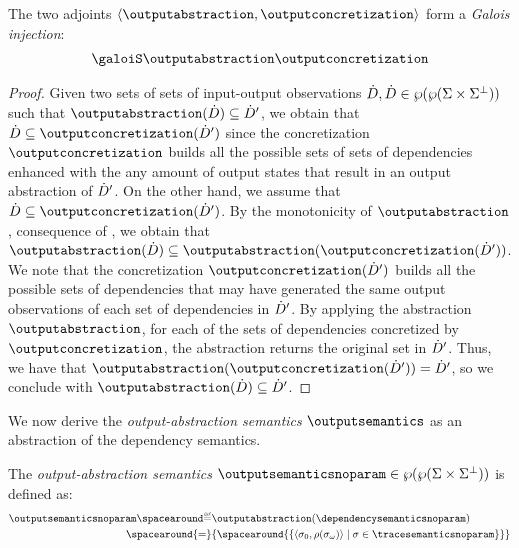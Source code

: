 \begin{theorem}
  The two adjoints $\tuple{\outputabstraction}{\outputconcretization}$ form a \emph{Galois injection}:
\begin{align*}
  \galoisinjbetweensemantics{dependency}{output}
\end{align*}
\end{theorem}
\begin{proof}
  Given two sets of sets of input-output observations $\dot{D}, \dot{D}\in\wp(\wp(\Sigma\times\Sigma^\bot))$ such that $\outputabstraction(\defsetofsetofdependencies)\subseteq\defsetofsetofdependencies'$, we obtain that $\defsetofsetofdependencies\subseteq\outputconcretization(\defsetofsetofdependencies')$ since the concretization $\outputconcretization$ builds all the possible sets of sets of dependencies enhanced with the any amount of output states that result in an output abstraction of $\dot{D}'$.
  On the other hand, we assume that $\defsetofsetofdependencies\subseteq\outputconcretization(\defsetofsetofdependencies')$.
  By the monotonicity of $\outputabstraction$, \cf{} consequence of , we obtain that $\outputabstraction(\defsetofsetofdependencies)\subseteq\outputabstraction(\outputconcretization(\defsetofsetofdependencies'))$.
  We note that the concretization $\outputconcretization(\defsetofsetofdependencies')$ builds all the possible sets of dependencies that may have generated the same output observations of each set of dependencies in $\dot{D}'$. By applying the abstraction $\outputabstraction$, for each of the sets of dependencies concretized by $\outputconcretization$, the abstraction returns the original set in $\dot{D}'$. Thus, we have that $\outputabstraction(\outputconcretization(\defsetofsetofdependencies')) = \defsetofsetofdependencies'$, so we conclude with $\outputabstraction(\defsetofsetofdependencies)\subseteq\defsetofsetofdependencies'$.
\end{proof}

We now derive the \emph{output-abstraction semantics} $\outputsemantics$ as an abstraction of the dependency semantics.

\begin{definition}
  The \emph{output-abstraction semantics} $\outputsemanticsnoparam\in\outputtype$ is defined as:
  \begin{align*}
    \outputsemanticsnoparam\DefeQ&\outputabstraction(\dependencysemanticsnoparam) \\
    \spacearound{=}&
    \{\spacearound{
      \setdef{
        \tuple{\retrieveinput{\deftrace}}{\outputobs(\retrieveoutput{\deftrace})}
      }{
        \deftrace \in \tracesemanticsnoparam
      }
    }\}
  \end{align*}
\end{definition}

